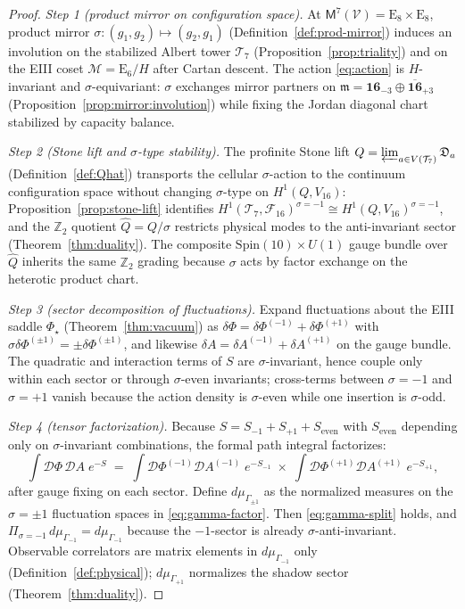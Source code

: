 \documentclass[aps,prd,onecolumn,amsmath,amssymb,nofootinbib,11pt]{revtex4-2}
\numberwithin{equation}{section}
\theoremstyle{plain}
\theoremstyle{definition}
\theoremstyle{remark}
\newcommand{\E}[1]{\mathrm{E}_{#1}}
\newcommand{\Spin}{\mathrm{Spin}}
\newcommand{\Void}{\mathcal{V}}
\newcommand{\Mirror}{\mathsf{M}}
\newcommand{\orderparam}{\Phi}
\begin{document}
\begin{proof}
\emph{Step 1 (product mirror on configuration space).}
At $\Mirror^7(\Void)=\E{8}\times\E{8}$, product mirror
$\sigma:(g_1,g_2)\mapsto(g_2,g_1)$
(Definition~\ref{def:prod-mirror}) induces an involution on the stabilized
Albert tower $\mathcal{T}_7$ (Proposition~\ref{prop:triality}) and on the
EIII coset $\mathcal{M}=\E{6}/H$ after Cartan descent. The action
\eqref{eq:action} is $H$-invariant and $\sigma$-equivariant: $\sigma$ exchanges
mirror partners on $\mathfrak{m}=\mathbf{16}_{-3}\oplus\overline{\mathbf{16}}_{+3}$
(Proposition~\ref{prop:mirror:involution}) while fixing the Jordan diagonal
chart stabilized by capacity balance.

\emph{Step 2 (Stone lift and $\sigma$-type stability).}
The profinite Stone lift $Q=\varprojlim_{a\in V(\mathcal{T}_7)}\mathfrak{D}_a$
(Definition~\ref{def:Qhat}) transports the cellular $\sigma$-action to the
continuum configuration space without changing $\sigma$-type on
$H^1(Q,V_{16})$: Proposition~\ref{prop:stone-lift} identifies
$H^1(\mathcal{T}_7,\mathcal{F}_{16})^{\sigma=-1}\cong
H^1(Q,V_{16})^{\sigma=-1}$, and the $\mathbb{Z}_2$ quotient
$\hat Q=Q/\sigma$ restricts physical modes to the anti-invariant sector
(Theorem~\ref{thm:duality}). The composite
$\Spin(10)\times U(1)$ gauge bundle over $\hat Q$ inherits the same
$\mathbb{Z}_2$ grading because $\sigma$ acts by factor exchange on the
heterotic product chart.

\emph{Step 3 (sector decomposition of fluctuations).}
Expand fluctuations about the EIII saddle $\orderparam_\star$
(Theorem~\ref{thm:vacuum}) as
$\delta\orderparam=\delta\orderparam^{(-1)}+\delta\orderparam^{(+1)}$ with
$\sigma\delta\orderparam^{(\pm1)}=\pm\delta\orderparam^{(\pm1)}$, and likewise
$\delta A=\delta A^{(-1)}+\delta A^{(+1)}$ on the gauge bundle.
The quadratic and interaction terms of $S$ are $\sigma$-invariant, hence
couple only within each sector or through $\sigma$-even invariants; cross-terms
between $\sigma=-1$ and $\sigma=+1$ vanish because the action density is
$\sigma$-even while one insertion is $\sigma$-odd.

\emph{Step 4 (tensor factorization).}
Because $S=S_{-1}+S_{+1}+S_{\mathrm{even}}$ with $S_{\mathrm{even}}$ depending
only on $\sigma$-invariant combinations, the formal path integral factorizes:
\begin{equation}\label{eq:gamma-factor}
  \int \mathcal{D}\orderparam\,\mathcal{D}A\;
  e^{-S}
  \;=\;
  \int \mathcal{D}\orderparam^{(-1)}\mathcal{D}A^{(-1)}\;
  e^{-S_{-1}}
  \;\times\;
  \int \mathcal{D}\orderparam^{(+1)}\mathcal{D}A^{(+1)}\;
  e^{-S_{+1}},
\end{equation}
after gauge fixing on each sector. Define $d\mu_{\Gamma_{\pm1}}$ as the
normalized measures on the $\sigma=\pm1$ fluctuation spaces in
\eqref{eq:gamma-factor}. Then \eqref{eq:gamma-split} holds, and
$\Pi_{\sigma=-1}\,d\mu_{\Gamma_{-1}}=d\mu_{\Gamma_{-1}}$ because the
$-1$-sector is already $\sigma$-anti-invariant. Observable correlators are
matrix elements in $d\mu_{\Gamma_{-1}}$ only (Definition~\ref{def:physical});
$d\mu_{\Gamma_{+1}}$ normalizes the shadow sector
(Theorem~\ref{thm:duality}).
\end{proof}
\end{document}
